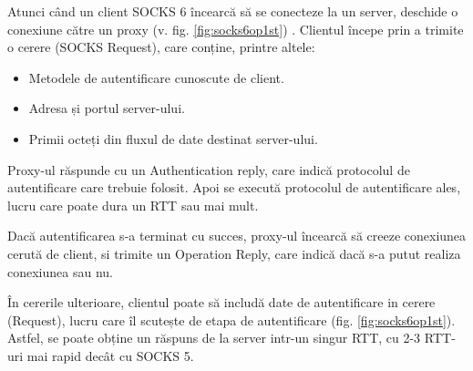 Atunci când un client SOCKS 6 încearcă să se conecteze la un server, deschide o conexiune către un proxy (v. fig. \ref{fig:socks6op1st}) .
Clientul începe prin a trimite o cerere (SOCKS Request), care conține, printre altele:
\begin{itemize}
	\item Metodele de autentificare cunoscute de client.
	\item Adresa și portul server-ului.
	\item Primii octeți din fluxul de date destinat server-ului.
\end{itemize}

Proxy-ul răspunde cu un Authentication reply, care indică protocolul de autentificare care trebuie folosit.
Apoi se execută protocolul de autentificare ales, lucru care poate dura un RTT sau mai mult.

Dacă autentificarea s-a terminat cu succes, proxy-ul încearcă să creeze conexiunea cerută de client, si trimite un Operation Reply, care indică dacă s-a putut realiza conexiunea sau nu.

În cererile ulterioare, clientul poate să includă date de autentificare in cerere (Request), lucru care îl scutește de etapa de autentificare (fig. \ref{fig:socks6op1st}).
Astfel, se poate obține un răspuns de la server intr-un singur RTT, cu 2-3 RTT-uri mai rapid decât cu SOCKS 5.

